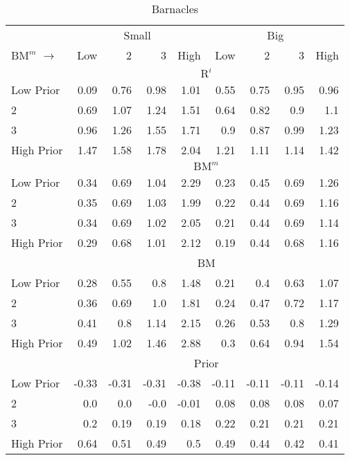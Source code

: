 
\begin{table}[!ht]
\scriptsize
\centering
\caption{Barnacles}
\begin{tabular}{lrrrrrrrr}
  \toprule
     & \multicolumn{4}{c}{Small} & \multicolumn{4}{c}{Big}  \\
     \cmidrule(r){2-5} \cmidrule(r){6-9}
    $\text{BM}^m$ $\rightarrow$ & Low & 2 & 3 & High & Low & 2 & 3 & High  \\ 
  \midrule
  
  
    & \multicolumn{8}{c}{$\text{R}^i$}  \\
     \cmidrule(r){2-5} \cmidrule(r){6-9}
    Low Prior  & 0.09  & 0.76  & 0.98  & 1.01  & 0.55  & 0.75  & 0.95  & 0.96   \\
    2  & 0.69  & 1.07  & 1.24  & 1.51  & 0.64  & 0.82  & 0.9  & 1.1   \\
    3  & 0.96  & 1.26  & 1.55  & 1.71  & 0.9  & 0.87  & 0.99  & 1.23   \\
    High Prior  & 1.47  & 1.58  & 1.78  & 2.04  & 1.21  & 1.11  & 1.14  & 1.42   \\
    
  
    & \multicolumn{8}{c}{$\text{BM}^m$}  \\
     \cmidrule(r){2-5} \cmidrule(r){6-9}
    Low Prior  & 0.34  & 0.69  & 1.04  & 2.29  & 0.23  & 0.45  & 0.69  & 1.26   \\
    2  & 0.35  & 0.69  & 1.03  & 1.99  & 0.22  & 0.44  & 0.69  & 1.16   \\
    3  & 0.34  & 0.69  & 1.02  & 2.05  & 0.21  & 0.44  & 0.69  & 1.14   \\
    High Prior  & 0.29  & 0.68  & 1.01  & 2.12  & 0.19  & 0.44  & 0.68  & 1.16   \\
    
  
    & \multicolumn{8}{c}{BM}  \\
     \cmidrule(r){2-5} \cmidrule(r){6-9}
    Low Prior  & 0.28  & 0.55  & 0.8  & 1.48  & 0.21  & 0.4  & 0.63  & 1.07   \\
    2  & 0.36  & 0.69  & 1.0  & 1.81  & 0.24  & 0.47  & 0.72  & 1.17   \\
    3  & 0.41  & 0.8  & 1.14  & 2.15  & 0.26  & 0.53  & 0.8  & 1.29   \\
    High Prior  & 0.49  & 1.02  & 1.46  & 2.88  & 0.3  & 0.64  & 0.94  & 1.54   \\
    
  
    & \multicolumn{8}{c}{Prior}  \\
     \cmidrule(r){2-5} \cmidrule(r){6-9}
    Low Prior  & -0.33  & -0.31  & -0.31  & -0.38  & -0.11  & -0.11  & -0.11  & -0.14   \\
    2  & 0.0  & 0.0  & -0.0  & -0.01  & 0.08  & 0.08  & 0.08  & 0.07   \\
    3  & 0.2  & 0.19  & 0.19  & 0.18  & 0.22  & 0.21  & 0.21  & 0.21   \\
    High Prior  & 0.64  & 0.51  & 0.49  & 0.5  & 0.49  & 0.44  & 0.42  & 0.41   \\
    

\end{tabular}
\end{table}
